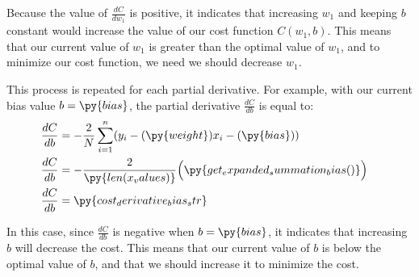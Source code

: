 \documentclass[12pt, demo]{article}
\begin{document}
Because the value of $\frac{dC}{dw_1}$ is positive, it indicates that increasing $w_1$ and keeping $b$ constant would increase the value of our cost function $C(w_1, b)$. This means that our current value of $w_1$ is greater than the optimal value of $w_1$, and to minimize our cost function, we need we should decrease $w_1$.


This process is repeated for each partial derivative. For example, with our current bias value $b = \py{bias}$, the partial derivative $\frac{dC}{db}$ is equal to:
\begin{align*}
	\frac{dC}{db} & = -\frac{2}{N} \sum_{i=1}^{n} (y_i - (\py{weight})x_i - (\py{bias}))
	\\
	\frac{dC}{db} & =
	\begin{aligned}[t]
		-\frac{2}{\py{len(x_values)}}
		\Big( & \py{get_expanded_summation_bias()}\Big)
	\end{aligned}
	\\
	\frac{dC}{db} & = \py{cost_derivative_bias_str}
\end{align*}

In this case, since $\frac{dC}{db}$ is negative when $b = \py{bias}$, it indicates that increasing $b$ will decrease the cost. This means that our current value of $b$ is below the optimal value of $b$, and that we should increase it to minimize the cost.
\end{document}
